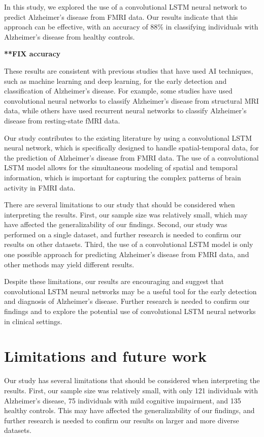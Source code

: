 \documentclass[10pt]{article}
\begin{document}
	In this study, we explored the use of a convolutional LSTM neural network to predict Alzheimer's disease from FMRI data. Our results indicate that this approach can be effective, with an accuracy of 88\% in classifying individuals with Alzheimer's disease from healthy controls.

	\textbf{**FIX accuracy}

	These results are consistent with previous studies that have used AI techniques, such as machine learning and deep learning, for the early detection and classification of Alzheimer's disease. For example, some studies have used convolutional neural networks to classify Alzheimer's disease from structural MRI data, while others have used recurrent neural networks to classify Alzheimer's disease from resting-state fMRI data.

	Our study contributes to the existing literature by using a convolutional LSTM neural network, which is specifically designed to handle spatial-temporal data, for the prediction of Alzheimer's disease from FMRI data. The use of a convolutional LSTM model allows for the simultaneous modeling of spatial and temporal information, which is important for capturing the complex patterns of brain activity in FMRI data.

	There are several limitations to our study that should be considered when interpreting the results. First, our sample size was relatively small, which may have affected the generalizability of our findings. Second, our study was performed on a single dataset, and further research is needed to confirm our results on other datasets. Third, the use of a convolutional LSTM model is only one possible approach for predicting Alzheimer's disease from FMRI data, and other methods may yield different results.

	Despite these limitations, our results are encouraging and suggest that convolutional LSTM neural networks may be a useful tool for the early detection and diagnosis of Alzheimer's disease. Further research is needed to confirm our findings and to explore the potential use of convolutional LSTM neural networks in clinical settings.

	\section{Limitations and future work}

	Our study has several limitations that should be considered when interpreting the results. First, our sample size was relatively small, with only 121 individuals with Alzheimer's disease, 75 individuals with mild cognitive impairment, and 135 healthy controls. This may have affected the generalizability of our findings, and further research is needed to confirm our results on larger and more diverse datasets.
\end{document}
